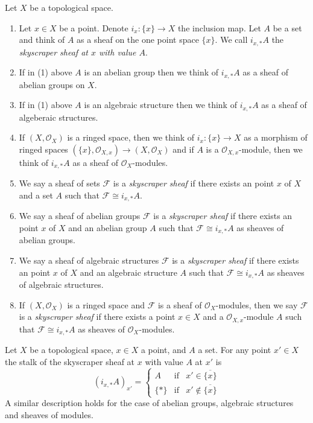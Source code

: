 \begin{definition}
\label{definition-skyscraper-sheaf}
Let $X$ be a topological space.
\begin{enumerate}
\item Let $x \in X$ be a point. Denote $i_x : \{x\} \to X$ the inclusion map.
Let $A$ be a set and think of $A$ as a sheaf on the one point space $\{x\}$.
We call $i_{x, *}A$ the {\it skyscraper sheaf at $x$ with value $A$}.
\item If in (1) above $A$ is an abelian group then we think of
$i_{x, *}A$ as a sheaf of abelian groups on $X$.
\item If in (1) above $A$ is an algebraic structure then we think
of $i_{x, *}A$ as a sheaf of algeberaic structures.
\item If $(X, \mathcal{O}_X)$ is a ringed space, then we think
of $i_x : \{x\} \to X$ as a morphism of ringed spaces
$(\{x\}, \mathcal{O}_{X, x}) \to (X, \mathcal{O}_X)$
and if $A$ is a $\mathcal{O}_{X, x}$-module, then we think
of $i_{x, *}A$ as a sheaf of $\mathcal{O}_X$-modules.
\item We say a sheaf of sets $\mathcal{F}$ is a {\it skyscraper sheaf}
if there exists an point $x$ of $X$ and a set $A$ such
that $\mathcal{F} \cong i_{x, *}A$.
\item We say a sheaf of abelian groups $\mathcal{F}$ is a
{\it skyscraper sheaf} if there exists an point $x$ of $X$
and an abelian group $A$ such that $\mathcal{F} \cong i_{x, *}A$
as sheaves of abelian groups.
\item We say a sheaf of algebraic structures $\mathcal{F}$ is a
{\it skyscraper sheaf} if there exists an point $x$ of $X$
and an algebraic structure $A$ such that $\mathcal{F} \cong i_{x, *}A$
as sheaves of algebraic structures.
\item If $(X, \mathcal{O}_X)$ is a ringed space and
$\mathcal{F}$ is a sheaf of $\mathcal{O}_X$-modules, then
we say $\mathcal{F}$ is a {\it skyscraper sheaf} if there
exists a point $x \in X$ and a $\mathcal{O}_{X, x}$-module
$A$ such that $\mathcal{F} \cong i_{x, *}A$
as sheaves of $\mathcal{O}_X$-modules.
\end{enumerate}
\end{definition}

\begin{lemma}
\label{lemma-skyscraper-stalks}
Let $X$ be a topological space, $x \in X$ a point, and
$A$ a set. For any point $x' \in X$ the stalk of the
skyscraper sheaf at $x$ with value $A$ at $x'$ is
$$
(i_{x, *}A)_{x'} =
\left\{
\begin{matrix}
A & \text{if} & x' \in \overline{\{x\}} \\
\{*\} & \text{if} & x' \not\in \overline{\{x\}}
\end{matrix}
\right.
$$
A similar description holds for the case of
abelian groups, algebraic structures and
sheaves of modules.
\end{lemma}

